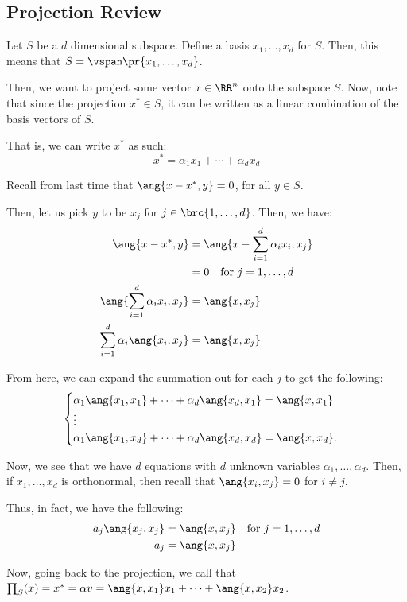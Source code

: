 \documentclass[openany]{book}
\begin{document}
\subsection{Projection Review}
\begin{example}
	Let $S$ be a $d$ dimensional subspace. Define a basis $x_1, \ldots, x_d$ for $S$. Then, this means that $S = \vspan\pr{x_1, \ldots, x_d}$.
	
	Then, we want to project some vector $x \in \RR^{n}$ onto the subspace $S$. Now, note that since the projection $x^{*} \in S$, it can be written as a linear combination of the basis vectors of $S$.
	
	That is, we can write $x^{*}$ as such:
	\begin{equation*}
		x^{*} = \alpha_1x_1 + \cdots + \alpha_dx_d
	\end{equation*}

	Recall from last time that $\ang{x - x^{*}, y} = 0$, for all $y \in S$.
	
	Then, let us pick $y$ to be $x_j$ for $j \in \brc{1, \ldots, d}$. Then, we have:
	\begin{align*}
		\ang{x - x^{*}, y} &= \ang{x - \sum_{i=1}^{d} \alpha_i x_i, x_j} \\
		&= 0 \quad\text{for $j = 1, \ldots, d$} \\
		\ang{\sum_{i=1}^{d} \alpha_i x_i, x_j} &= \ang{x, x_j} \\
		\sum_{i=1}^{d}\alpha_i \ang{x_i, x_j} &= \ang{x, x_j}
	\end{align*}
	
	From here, we can expand the summation out for each $j$ to get the following:
	\begin{equation*}
		\begin{cases}
			\alpha_1\ang{x_1, x_1} + \cdots + \alpha_d\ang{x_d, x_1} = \ang{x, x_1} \\
			\vdots \\
			\alpha_1\ang{x_1, x_d} + \cdots + \alpha_d\ang{x_d, x_d} = \ang{x, x_d}.
		\end{cases}
	\end{equation*}

	Now, we see that we have $d$ equations with $d$ unknown variables $\alpha_1, \ldots, \alpha_d$. Then, if $x_1, \ldots, x_d$ is orthonormal, then recall that $\ang{x_i, x_j} = 0$ for $i \neq j$.
	
	Thus, in fact, we have the following:
	\begin{align*}
		a_j \ang{x_j, x_j} &= \ang{x, x_j} \quad \text{for $j = 1, \ldots, d$} \\
		a_j &= \ang{x, x_j}
	\end{align*}

	Now, going back to the projection, we call that $\prod_{S}^{}(x) = x^{*} = \alpha v = \ang{x, x_1}x_1 + \cdots + \ang{x, x_2}x_2$.
\end{example}
\end{document}
